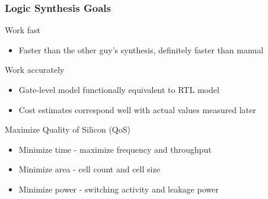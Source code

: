 \documentclass[t, notes, xcolor=table]{beamer}
\begin{document}
\begin{frame}
\frametitle{Logic Synthesis Goals}
\footnotesize{
Work fast

\begin{itemize}
\item Faster than the other guy’s synthesis, definitely faster than manual
\end{itemize}

Work accurately

\begin{itemize}
\item Gate-level model functionally equivalent to RTL model
\item Cost estimates correspond well with actual values measured later
\end{itemize}

Maximize Quality of Silicon (QoS)

\begin{itemize}
\item Minimize time - maximize frequency and throughput
\item Minimize area - cell count and cell size
\item Minimize power - switching activity and leakage power
\end{itemize}
}
\end{frame}
\end{document}
